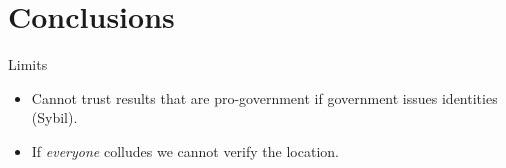 \section{Conclusions}

\begin{frame}
  \begin{alertblock}{Limits}
    \begin{itemize}
      \item Cannot trust results that are pro-government if government issues 
        identities (Sybil).

        \pause{}

      \item If \emph{everyone} colludes we cannot verify the location.
    \end{itemize}
  \end{alertblock}
\end{frame}
